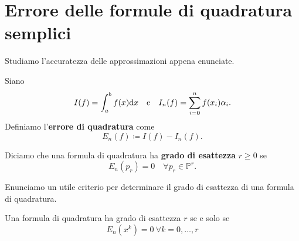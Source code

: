 \section{Errore delle formule di quadratura semplici}
Studiamo l'accuratezza delle approssimazioni appena enunciate.
\begin{definition}
Siano
$$
  I(f) =\int ^{b}_{a} f(x) \mathrm d x
  \quad \text{e} \quad
  I_{n}(f) =\sum\limits ^{n}_{i=0} f( x_{i}) \alpha _{i}.
$$
Definiamo l'\textbf{errore di quadratura} come
\begin{equation*}
E_{n}(f) \coloneqq I(f) -I_{n}(f).
\end{equation*}
\end{definition}
\begin{definition}
Diciamo che una formula di quadratura ha \textbf{grado di esattezza} $r\geqslant 0$ se
\begin{equation*}
E_{n}( p_{r}) =0\quad \forall p_{r} \in \mathbb{P}^{r}.
\end{equation*}
\end{definition}
Enunciamo un utile criterio per determinare il grado di esattezza di una formula di quadratura.
\begin{theorem}
Una formula di quadratura ha grado di esattezza $r$ se e solo se 
\[E_n(x^k)=0\ \forall k=0,\dots,r\]
\end{theorem}

